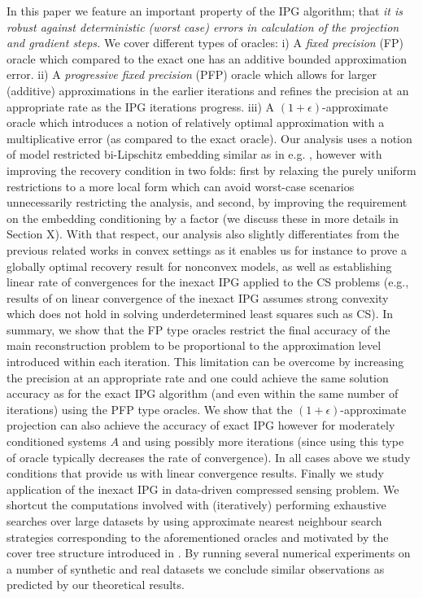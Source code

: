 In this paper we feature an important property of the IPG algorithm; that \emph{it is robust against deterministic (worst case) errors in calculation of the projection and gradient steps.} 
We cover different types of oracles: i) A \emph{fixed precision} (FP) oracle which compared to the exact one has an additive bounded approximation error.  ii) A \emph{progressive fixed precision} (PFP) oracle which allows for larger (additive) approximations in the earlier iterations and refines the precision at an appropriate rate as the IPG iterations progress. iii) A $(1+\epsilon)$-approximate oracle which introduces a notion of relatively optimal approximation with a multiplicative error (as compared to the exact oracle). Our analysis uses a notion of model restricted bi-Lipschitz embedding similar as in e.g. \cite{Blumen}, however with improving the 
recovery condition in two folds: first by relaxing the purely uniform restrictions to a more local form which can avoid worst-case scenarios unnecessarily restricting the analysis, and second, by improving the requirement on the embedding conditioning by a factor (we discuss these in more details in Section X). With that respect, our analysis also slightly differentiates from the previous related works in convex settings as it enables us for instance to prove a globally optimal recovery result for nonconvex models, as well as establishing linear rate of convergences for the inexact IPG applied to the CS problems (e.g., results of \cite{BachinexactIPG} on linear convergence of the inexact IPG assumes strong convexity which does not hold in solving underdetermined least squares such as CS). In summary, we show that the FP type oracles restrict the final accuracy of the main reconstruction problem to be proportional to the approximation level introduced within each iteration. This limitation can be overcome by increasing the precision at an appropriate rate and one could achieve the same solution accuracy as for the exact IPG algorithm (and even within the same number of iterations) using the PFP type oracles. We show that the $(1+\epsilon)$-approximate projection can also achieve the accuracy of exact IPG however for moderately conditioned systems $A$ and using possibly more iterations (since using this type of oracle typically decreases the rate of convergence). In all cases above we study conditions that provide us with linear convergence results. Finally we study application of the inexact IPG  in data-driven compressed sensing problem. We shortcut the computations involved with (iteratively) performing exhaustive searches over large datasets by using approximate nearest neighbour search strategies corresponding to the aforementioned oracles and motivated by the cover tree structure introduced in \cite{beygelzimer2006cover}. By running several numerical experiments on a number of synthetic and real datasets we conclude similar observations as predicted by  our theoretical results.

